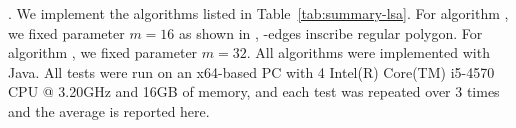 





.
We implement the algorithms listed in Table~\ref{tab:summary-lsa}.
For algorithm \cised, we fixed parameter $m=16$ as shown in \cite{Lin:Cised}, -edges inscribe regular polygon.
For algorithm \nopts, we fixed parameter $m=32$. 
All algorithms were implemented with Java.
All tests were run on an x64-based  PC with 4 Intel(R) Core(TM) i5-4570 CPU @ 3.20GHz  and 16GB of memory, and each test was repeated
over 3 times and the average is reported here.


